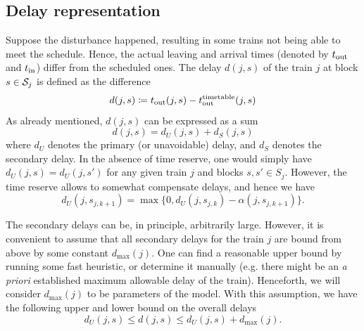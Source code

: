 \subsection{Delay representation}
Suppose the disturbance happened, resulting in some trains not being able to
meet the schedule. Hence, the actual leaving and arrival times (denoted by
$t_\text{out}$ and $t_\text{in}$) differ from the scheduled ones. The delay $d(j, s)$ of the
train $j$ at block $s \in \mathcal{S}_j$ is defined as the difference
\begin{equation}
  \label{eq:djs}
  d(j, s) \coloneqq \tout(j, s) - \ttout(j, s) %
\end{equation}
As already mentioned, $d(j, s)$ can be expressed as a sum
\begin{equation}
  d(j, s) = d_U(j, s) + d_S(j, s)
\end{equation}
where $d_U$ denotes the primary (or unavoidable) delay, and $d_S$ denotes the
secondary delay. In the absence of time reserve, one would simply have $d_U(j,
  s) = d_U(j, s')$ for any given train $j$ and blocks $s,s' \in S_{j}$. However,
the time reserve allows to somewhat compensate delays, and hence we have
\begin{equation}
  d_U(j, s_{j,k+1}) = \max\{0, d_U(j, s_{j,k}) - \alpha(j, s_{j,k+1})\}.
\end{equation}

The secondary delays can be, in principle, arbitrarily large. However, it is
convenient to assume that all secondary delays for the train $j$ are bound from
above by some constant $d_{\max}(j)$. One can find a reasonable upper bound by
running some fast heuristic, or determine it manually (e.g. there might be an
\emph{a priori} established maximum allowable delay of the train). Henceforth,
we will consider $d_{\max}(j)$ to be parameters of the model. With this
assumption, we have the following upper and lower bound on the overall delays
\begin{equation}
  d_U(j, s) \le d(j, s) \le d_U(j, s) + d_{\max}(j).
\end{equation}

